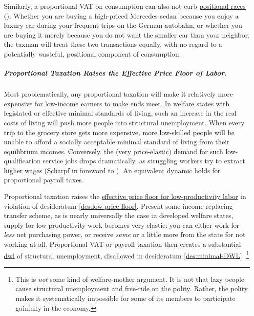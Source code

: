 Similarly, a proportional VAT on consumption can also not curb \hyperref[sec:positional-race]{positional races} ().
Whether you are buying a high-priced Mercedes sedan because you enjoy a luxury car during your frequent trips on the German autobahn, or whether you are buying it merely because you do not want the smaller car than your neighbor, the taxman will treat these two transactions equally, with no regard to a potentially wasteful, positional component of consumption.

\subparagraph{Proportional Taxation Raises the Effective Price Floor of Labor.}
	\label{sec:PropTaxDWL}
Most problematically, any proportional taxation will make it relatively more expensive for low-income earners to make ends meet.
In welfare states with legislated or effective minimal standards of living, such an increase in the real costs of living will push more people into structural unemployment.
When every trip to the grocery store gets more expensive, more low-skilled people will be unable to afford a socially acceptable minimal standard of living from their equilibrium incomes.
Conversely, the (very price-elastic) demand for such low-qualification service jobs drops dramatically, as struggling workers try to extract higher wages (Scharpf in foreword to \citealt[12ff]{Ganghof2004}).
An equivalent dynamic holds for proportional payroll taxes.

Proportional taxation raises the \hyperref[des:low-price-floor]{effective price floor for low-productivity labor} in violation of desideratum \ref{des:low-price-floor}.
Present some income-replacing transfer scheme, as is nearly universally the case in developed welfare states, supply for low-productivity work becomes very elastic:
you can either work for \emph{less} net purchasing power, or receive \emph{same} or a little more from the state for not working at all.
Proportional VAT or payroll taxation then creates a substantial \hyperref[des:minimal-DWL]{dwl} of structural unemployment, disallowed in desideratum \ref{des:minimal-DWL}.
\footnote{
	This is \emph{not} some kind of welfare-mother argument.
	It is not that lazy people cause structural unemployment and free-ride on the polity.
	Rather, the polity makes it systematically impossible for some of its members to participate gainfully in the economy.
}

